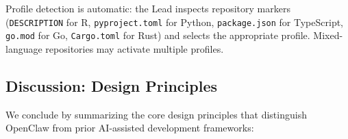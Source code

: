 \noindent
Profile detection is automatic: the Lead inspects repository markers
(\texttt{DESCRIPTION} for R, \texttt{pyproject.toml} for Python,
\texttt{package.json} for TypeScript, \texttt{go.mod} for Go,
\texttt{Cargo.toml} for Rust) and selects the appropriate profile.
Mixed-language repositories may activate multiple profiles.


\subsection{Discussion: Design Principles}
\label{sec:design-principles}

We conclude by summarizing the core design principles that
distinguish OpenClaw from prior AI-assisted development frameworks:

